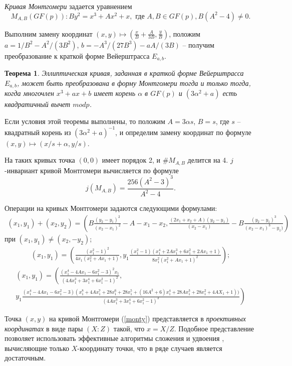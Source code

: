 \documentclass[a4paper,12pt]{article}
\newtheorem{theorem}{Теорема}
\theoremstyle{definition}
\begin{document}
\emph{Кривая Монтгомери} задается уравнением 
\begin{equation}\label{monty}
M_{A,B}(GF(p)): By^2=x^3+Ax^2+x, \text{ где } A,B\in GF(p), B(A^2-4)\neq 0.
\end{equation}

Выполним замену координат $(x,y)\mapsto\left(\frac{x}{B}+\frac{A}{3B},\frac{y}{B}\right)$, положим  $a=1/B^2-A^2/(3B^2)$, $b=-A^3/(27B^3)-aA/(3B)$ 
-- получим преобразование к краткой форме Вейерштрасса $E_{a,b}$.

\begin{theorem} Эллиптическая кривая, заданная в краткой форме Вейерштрасса $E_{a,b}$,
 может быть преобразована в форму Монтгомери тогда и только тогда, когда многочлен $x^3+ax+b$ 
имеет корень $\alpha$ в $GF(p)$ и $(3\alpha^2+a)$ есть квадратичный вычет $mod p$.
\end{theorem}

Если условия этой теоремы выполнены, то положим $A=3\alpha s$, $B=s$, где $s$ -- квадратный корень из $(3\alpha^2+a)^{-1}$, 
и определим замену координат по формуле $(x,y)\mapsto (x/s+\alpha,y/s)$.

На таких кривых точка $(0,0)$ имеет порядок 2, и $\#M_{A,B}$ делится на 4. $j$-инвариант кривой Монтгомери вычисляется по формуле
$$
j(M_{A,B})=\frac{256(A^2-3)^3}{A^2-4}.
$$

Операции на кривых Монтгомери задаются следующими формулами:
\small
\begin{multline*}
(x_1,y_1)+(x_2,y_2)=\left(B\frac{(y_2-y_1)^2}{(x_2-x_1)^2}-A-x_1-x_2, \frac{(2x_1+x_2+A)(y_2-y_1)}{(x_2-x_1)}-B\frac{(y_2-y_1)^3}{(x_2-x_1)^3-y_1)}\right)
\end{multline*}
при $(x_1,y_1)\neq(x_2,-y_2)$;
\begin{multline*}
[2](x_1,y_1)= \left(\frac{(x_1^2-1)^2}{4x_1(x_1^2+Ax_1+1)} , y_1\frac{(x_1^2-1)(x_1^4+2Ax_1^3+6x_1^2+2Ax_1+1)}{8x_1^2(x_1^2+Ax_1+1)^2}\right);
\end{multline*}
\begin{multline*}
[3](x_1,y_1)= \left(\frac{(x_1^4-4Ax_1-6x_1^2-3)^2x_1}{(4Ax_1^3+3x_1^4+6x_1^2-1)^2}\right., \\
\left.y_1\frac{(x_1^4-4Ax_1-6x_1^2-3)(x_1^8+4Ax_1^7+28x_1^6+28x_1^5+(16A^2+6)x_1^4+28Ax_1^3+28x_1^2+4AX_1+1))}{(4Ax_1^3+3x_1^4+6x_1^2-1)^3}\right)
\end{multline*}
\large


Точка $(x,y)$ на кривой Монтгомери (\ref{monty}) представляется в \emph{проективных координатах} в виде пары $(X:Z)$ такой, что $x=X/Z$.
Подобное представление позволяет использовать эффективные алгоритмы сложения и удвоения \cite{EFD,Mon}, вычисляющие только $X$-координату точки, 
что в ряде случаев %
является достаточным.
\end{document}
